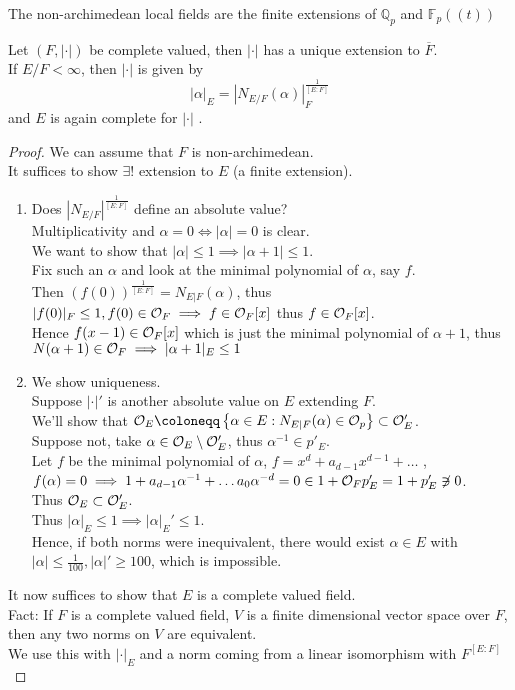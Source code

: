 \documentclass[../main.tex]{subfiles}
\begin{document}
\begin{thm}
	The non-archimedean local fields are the finite extensions of $ \mathbb{Q}_p$ and $ \mathbb{F}_p ( ( t) ) $ 
\end{thm}
\begin{thm}
	Let $( F,|\cdot|) $ be complete valued, then $|\cdot|$ has a unique extension to $ \overline{F}$.\\
	If $E /F < \infty $, then $|\cdot| $ is given by 
	\[ 
		|\alpha|_E = | N_{E /F} ( \alpha) |_F^{\frac{1}{[E:F]}}
	\]
	and $E$ is again complete for $|\cdot|$ .
	
\end{thm}
\begin{proof}
We can assume that $F$ is non-archimedean.\\
It suffices to show $\exists !$ extension to $E$ (a finite extension).\\
\begin{enumerate}
\item Does $|N_{E/F} |^{\frac{1}{ [ E:F] }}$ define an absolute value?\\
	Multiplicativity and $\alpha=0 \iff |\alpha|=0$ is clear.\\
	We want to show that $|\alpha| \leq 1 \implies |\alpha+1| \leq 1$.\\
	Fix such an $\alpha$ and look at the minimal polynomial of $\alpha$, say $f$.\\
	Then $( f( 0) )^{\frac{1}{[E:F]}}= N_{E|F} ( \alpha) $, thus $|f( 0) |_F \leq 1, f( 0) \in \mathcal{O}_F\implies f \in \mathcal{O}_F[x]$ thus $f\in \mathcal{O}_F[x]$.\\
	Hence $f( x-1) \in \mathcal{O}_F[x]$ which is just the minimal polynomial of $\alpha+1$, thus $N( \alpha+1) \in \mathcal{O}_F\implies |\alpha+1|_E \leq 1$ 
\item We show uniqueness.\\
	Suppose $|\cdot|'$ is another absolute value on $E$ extending $F$.\\
	We'll show that $\O_E \coloneqq  \left\{ \alpha \in E: N_{E|F} ( \alpha) \in \O_p \right\} \subset \O_E'$.\\
	Suppose not, take $\alpha\in \mathcal{O}_E \setminus \mathcal{O}_{E}'$, thus $\alpha ^{-1}\in p'_E$.\\
	Let $f$ be the minimal polynomial of $\alpha$, $f= x^{d}+ a_{d-1} x^{d-1}+ \ldots$ , $f( \alpha) =0\implies 1 + a_{d-1} \alpha ^{-1}+ \ldots a_0 \alpha ^{-d}=0\in 1+ \mathcal{O}_F p_E' = 1 + p_{E} ' \not\ni 0$.\\
	Thus $\mathcal{O}_E \subset \mathcal{O}_{E}'$.\\
	Thus $|\alpha|_E \leq 1 \implies |\alpha|_E' \leq 1$.\\
	Hence, if both norms were inequivalent, there would exist $\alpha\in E$ with $|\alpha| \leq \frac{1}{100}, |\alpha|' \geq 100$, which is impossible.
\end{enumerate}
It now suffices to show that $E$ is a complete valued field.\\
Fact: If $F$ is a complete valued field, $V $ is a finite dimensional vector space over $F$, then any two norms on $V$ are equivalent.\\
We use this with $|\cdot|_E$ and a norm coming from a linear isomorphism with $F^{[E:F]}$ 	
\end{proof}
\end{document}
